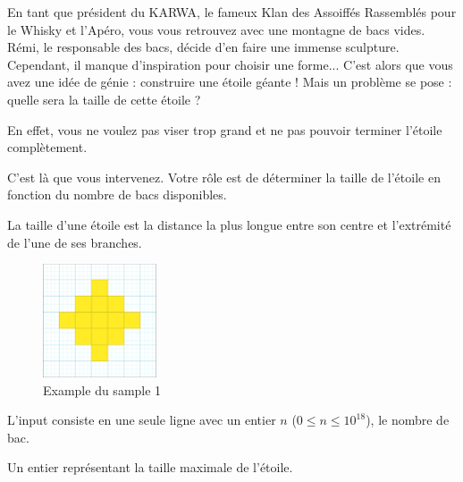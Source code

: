 \problemname{}


\newcommand{\maxn}{10^18}

En tant que président du KARWA, le fameux Klan des Assoiffés Rassemblés pour le Whisky et l'Apéro, vous vous retrouvez avec une montagne de bacs vides. Rémi, le responsable des bacs, décide d'en faire une immense sculpture. Cependant, il manque d'inspiration pour choisir une forme... 
C'est alors que vous avez une idée de génie : construire une étoile géante ! Mais un problème se pose : quelle sera la taille de cette étoile ?

En effet, vous ne voulez pas viser trop grand et ne pas pouvoir terminer l'étoile complètement.

C'est là que vous intervenez. Votre rôle est de déterminer la taille de l'étoile en fonction du nombre de bacs disponibles.

La taille d'une étoile est la distance la plus longue entre son centre et l'extrémité de l'une de ses branches.

\smallskip
\begin{figure}[h]
    \centering
    \includegraphics[width=0.3\textwidth]{example.png}
    \caption{Example du sample 1}
\end{figure}


\begin{Input}
    L'input consiste en une seule ligne avec un entier $n$ ($0\leq n\leq \maxn$), le nombre de bac.
\end{Input}

\begin{Output}
    Un entier représentant la taille maximale de l'étoile.
\end{Output}

